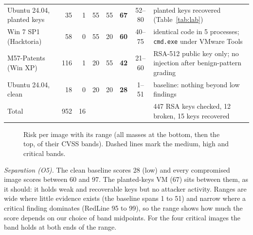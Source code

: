 \begin{table}[t]
\begin{tabularx}{\textwidth}{@{}lrrrrrcX@{}}
Ubuntu 24.04, planted keys & 35 & 1 & 55 & 55 & \textbf{67} & 52--80 & planted keys recovered (Table~\ref{tab:lab})\\
Win 7 SP1 (Hacktoria) & 58 & 0 & 55 & 20 & \textbf{60} & 40--75 & identical code in 5 processes; \texttt{cmd.exe} under VMware Tools\\
M57-Patents (Win XP) & 116 & 1 & 20 & 55 & \textbf{42} & 21--60 & RSA-512 public key only; no injection after benign-pattern grading\\
Ubuntu 24.04, clean & 18 & 0 & 20 & 20 & \textbf{28} & 1--51 & baseline: nothing beyond low findings\\
\midrule
Total & 952 & 16 & & & & & 447 RSA keys checked, 12 broken, 15 keys recovered\\
\bottomrule
\end{tabularx}
\end{table}

\begin{figure}[t]
\centering
{}
\caption{Risk per image with its range (all masses at the bottom, then the top, of their CVSS bands). Dashed
lines mark the medium, high and critical bands.}
\label{fig:risk}
\end{figure}

\textit{Separation (O5).} The clean baseline scores 28 (low) and every compromised image scores between 60
and 97. The planted-keys VM (67) sits between them, as it should: it holds weak and recoverable keys but no
attacker activity. Ranges are wide where little evidence exists (the baseline spans 1 to 51) and narrow where a
critical finding dominates (RedLine 95 to 99), so the range shows how much the score depends on our choice
of band midpoints. For the four critical images the band holds at both ends of the range.


